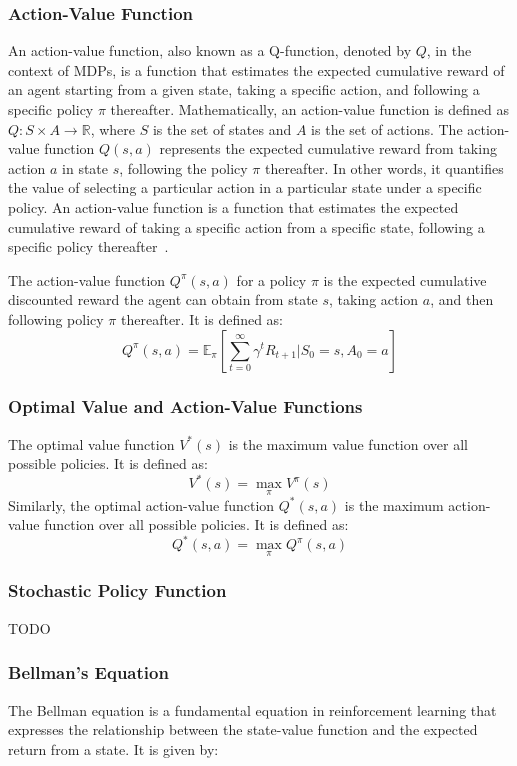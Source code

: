 \documentclass[../xlapes02]{subfiles}
\begin{document}
    \subsubsection{Action-Value Function}
    An action-value function, also known as a Q-function, denoted by $Q$, in the context of MDPs, is a function that estimates the expected cumulative reward of an agent starting from a given state, taking a specific action, and following a specific policy $\pi$ thereafter. Mathematically, an action-value function is defined as $Q: S \times A \rightarrow \mathbb{R}$, where $S$ is the set of states and $A$ is the set of actions. The action-value function $Q(s,a)$ represents the expected cumulative reward from taking action $a$ in state $s$, following the policy $\pi$ thereafter. In other words, it quantifies the value of selecting a particular action in a particular state under a specific policy. An action-value function is a function that estimates the expected cumulative reward of taking a specific action from a specific state, following a specific policy thereafter~\cite{GPT3.5}.

    The action-value function $Q^{\pi}(s, a)$ for a policy $\pi$ is the expected cumulative discounted reward the agent can obtain from state $s$, taking action $a$, and then following policy $\pi$ thereafter. It is defined as:
    \[
        Q^{\pi}(s, a) = \mathbb{E}_{\pi}\left[\sum_{t=0}^{\infty} \gamma^t R_{t+1} | S_0 = s, A_0 = a\right]
    \]

    \subsubsection{Optimal Value and Action-Value Functions}
    The optimal value function $V^*(s)$ is the maximum value function over all possible policies. It is defined as:
    \[
        V^*(s) = \max_{\pi} V^{\pi}(s)
    \]
    Similarly, the optimal action-value function $Q^*(s, a)$ is the maximum action-value function over all possible policies. It is defined as:
    \[
        Q^*(s, a) = \max_{\pi} Q^{\pi}(s, a)
    \]

    \subsubsection{Stochastic Policy Function}\label{subsubsec:stochastic-policy-function}
    TODO

    \subsubsection{Bellman's Equation}\label{subsubsec:bellman-equation}
    The Bellman equation is a fundamental equation in reinforcement learning that expresses the relationship between the state-value function and the expected return from a state. It is given by:
\end{document}
